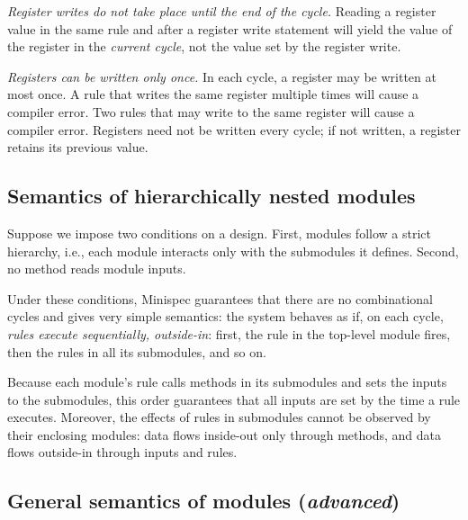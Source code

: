 \emph{Register writes do not take place until the end of the cycle.}
Reading a register value in the same rule and after a register write statement
will yield the value of the register in the  \emph{current cycle},
not the value set by the register write.

\emph{Registers can be written only once.}
In each cycle, a register may be written at most once.
A rule that writes the same register multiple times will cause a compiler error.
Two rules that may write to the same register will cause a compiler error.
Registers need not be written every cycle; if not written, a register retains its previous value.


\subsection{Semantics of hierarchically nested modules}
\label{sec:basicmodsemantics}

Suppose we impose two conditions on a design.
First, modules follow a strict hierarchy,
i.e., each module interacts only with the submodules it defines.
Second, no method reads module inputs.

Under these conditions, Minispec guarantees that there are no combinational cycles and gives very simple semantics:
the system behaves as if, on each cycle, \emph{rules execute sequentially, outside-in}:
first, the rule in the top-level module fires,
then the rules in all its submodules, and so on.

Because each module's rule calls methods in its submodules and sets the inputs to the submodules,
this order guarantees that all inputs are set by the time a rule executes.
Moreover, the effects of rules in submodules cannot be observed
by their enclosing modules: data flows inside-out only through methods,
and data flows outside-in through inputs and rules.

\subsection{General semantics of modules (\emph{advanced})}
\label{sec:generalmodsemantics}

